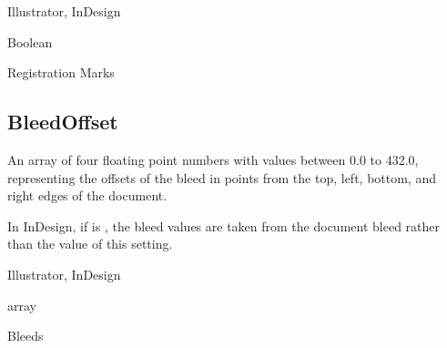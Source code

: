 \documentclass[letterpaper,12pt,english,openany,oneside]{sphinxmanual}
\begin{document}
\label{\detokenize{PDF_Create_NewNamespaces:supported-by-4}}

Illustrator, InDesign

\label{\detokenize{PDF_Create_NewNamespaces:type-4}}

Boolean

\label{\detokenize{PDF_Create_NewNamespaces:ui-name-4}}

Registration Marks

\label{\detokenize{PDF_Create_NewNamespaces:default-value-4}}

\begin{sphinxVerbatim}[commandchars=\\\{\}]
\end{sphinxVerbatim}




\subsection{BleedOffset}
\label{\detokenize{PDF_Create_NewNamespaces:bleedoffset}}
An array of four floating point numbers with values between 0.0 to 432.0, representing the offsets of the bleed in points from the top, left, bottom, and right edges of the document.

In InDesign, if  is  , the bleed values are taken from the document bleed rather than the value of this setting.

\label{\detokenize{PDF_Create_NewNamespaces:supported-by-5}}

Illustrator, InDesign

\label{\detokenize{PDF_Create_NewNamespaces:type-5}}

array

\label{\detokenize{PDF_Create_NewNamespaces:ui-name-5}}

Bleeds

\label{\detokenize{PDF_Create_NewNamespaces:default-value-5}}

\begin{sphinxVerbatim}[commandchars=\\\{\}]
\PYG{p}{[}   \PYG{p}{]}
\end{sphinxVerbatim}
\end{document}

